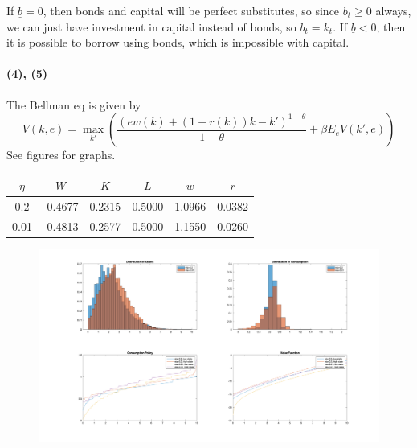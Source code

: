 \documentclass[10pt,letter]{article}
\newcommand{\problempart}[1]{\paragraph{#1}}
\begin{document}
If $\underline{b} = 0$, then bonds and capital will be perfect substitutes, so since $b_t \ge 0$ always, we can just have investment in capital instead of bonds, so $b_t = k_t$. If $\underline{b} < 0$, then it is possible to borrow using bonds, which is impossible with capital.
\problempart{(4), (5)}
The Bellman eq is given by
\[ V(k,e) = \max_{k'}\left( \frac{(e w(k) + (1+r(k)) k - k')^{1-\theta}}{1-\theta} + \beta E_eV(k',e) \right) \]
See figures for graphs.
\begin{center}
\begin{tabular}{|c|c|c|c|c|c|}
\hline
$\eta$ & $W$ & $K $& $L$ & $w$ & $r$ \\ \hline
0.2 & -0.4677 & 0.2315 & 0.5000 & 1.0966 & 0.0382 \\
0.01 & -0.4813 & 0.2577 & 0.5000 & 1.1550 & 0.0260 \\
\hline
\end{tabular}
\end{center}
\begin{figure}
\begin{center}
\includegraphics[width=14cm]{ps5fig1}
\end{center}
\end{figure}
\end{document}
